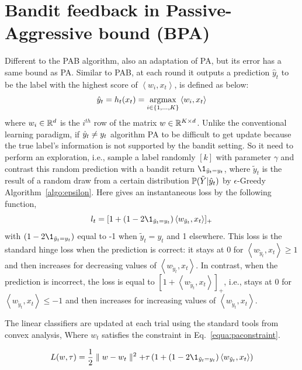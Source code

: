\section{Bandit feedback in Passive-Aggressive bound (BPA)}
\label{subsec:BPA}
Different to the PAB algorithm,  \cite{zhong2015passive} also an adaptation of PA, but its error has a same bound as PA. Similar to PAB, at each round it outputs a prediction $\hat{y}_t$ to be the label with the highest score of $\left\langle w_i,x_t\right\rangle$, is defined as below:
\begin{equation}
\hat{y}_t = h_t(x_t) = \underset{i\in \{1,\dots,K\}}{\text{argmax}}\left\langle w_i,x_t\right\rangle
\end{equation}
where $w_i\in \mathbb{R}^d$ is the $i^{th}$ row of the matrix $w\in \mathbb{R}^{K\times d}$. 
Unlike the conventional learning paradigm, if $\hat{y}_t\neq y_t$ algorithm PA to be difficult to get update because the true label's information is not supported by the bandit setting. 
So it need to perform an exploration, i.e., sample a label randomly $[k]$ with parameter $\gamma$ and contrast this random prediction with a bandit return $\1_{\tilde{y}_t = y_t}$, 
where $\tilde{y}_t$ is the result of a random draw from a certain distribution $\mathbb{P}(\tilde{Y}|\hat{y}_t)$ by $\epsilon$-Greedy Algorithm~\ref{algo:epsilon}. Here gives an instantaneous loss by the following function,
\begin{equation}
\label{equa:BPAloss}
l_t = [1+\left(1-2\1_{\tilde{y}_t=y_t}\right)\left\langle w_{\tilde{y}_t},x_t\right\rangle]_{+}
\end{equation}
with $\left(1-2\1_{\tilde{y}_t=y_t}\right)$ equal to -1 when $\tilde{y}_t = y_t$ and 1 elsewhere. 
This loss is the standard hinge loss when the prediction is correct: it stays at 0 for $\left\langle w_{\tilde{y}_t},x_t\right\rangle \geqslant 1$ and then increases for decreasing values of $\left\langle w_{\tilde{y}_t},x_t\right\rangle$. 
In contrast, when the prediction is incorrect, the loss is equal to $[1+\left\langle w_{\tilde{y}_t},x_t\right\rangle]_{+}$, 
i.e., stays at 0 for $\left\langle w_{\tilde{y}_t},x_t\right\rangle\leq -1$ 
and then increases for increasing values of $\left\langle w_{\tilde{y}_t},x_t\right\rangle$.

The linear classifiers are updated at each trial using the standard tools from convex analysis\cite{Boyd04}, Where $w_t$ satisfies the constraint in Eq.~\ref{equa:paconstraint}.

\begin{equation}
\label{equa:pablagrangian}
L(w,\tau) = \frac{1}{2}\parallel{w-w_t}\parallel^2 + \tau \left(1+ (1-2\1_{\tilde{y}_t=y_t})\left\langle w_{\tilde{y}_t},x_t\right\rangle\right)
\end{equation}

